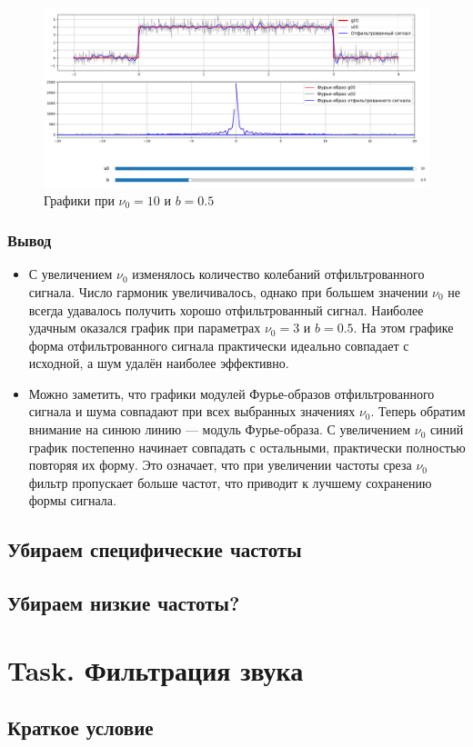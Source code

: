 \documentclass[a4paper,12pt]{article}
\begin{document}
\begin{figure}[H]  
    \centering
    \includegraphics[width=1\textwidth]{../images/1.1_0.5_10.png}
    \caption{Графики при \(\nu_0 = 10\) и \(b = 0.5\)}  
    \label{fig:my_image}  
\end{figure}

\subsubsection{Вывод}

\begin{itemize}
    \item С увеличением \(\nu_0\) изменялось количество колебаний отфильтрованного сигнала. 
    Число гармоник увеличивалось, однако при большем значении \(\nu_0\) не всегда удавалось получить
    хорошо отфильтрованный сигнал. Наиболее удачным оказался график при параметрах \(\nu_0 = 3\) и \(b = 0.5\). 
    На этом графике форма отфильтрованного сигнала практически идеально совпадает с исходной, 
    а шум удалён наиболее эффективно.

    \item Можно заметить, что графики модулей Фурье-образов отфильтрованного сигнала и шума совпадают 
    при всех выбранных значениях \(\nu_0\). Теперь обратим внимание на синюю линию — модуль Фурье-образа. 
    С увеличением \(\nu_0\) синий график постепенно начинает совпадать с остальными, практически 
    полностью повторяя их форму. Это означает, что при увеличении частоты среза \(\nu_0\) фильтр 
    пропускает больше частот, что приводит к лучшему сохранению формы сигнала.


\end{itemize}








\subsection{Убираем специфические частоты}
\subsection{Убираем низкие частоты?}




\section{Task. Фильтрация звука}
\subsection{Краткое условие}
\end{document}

